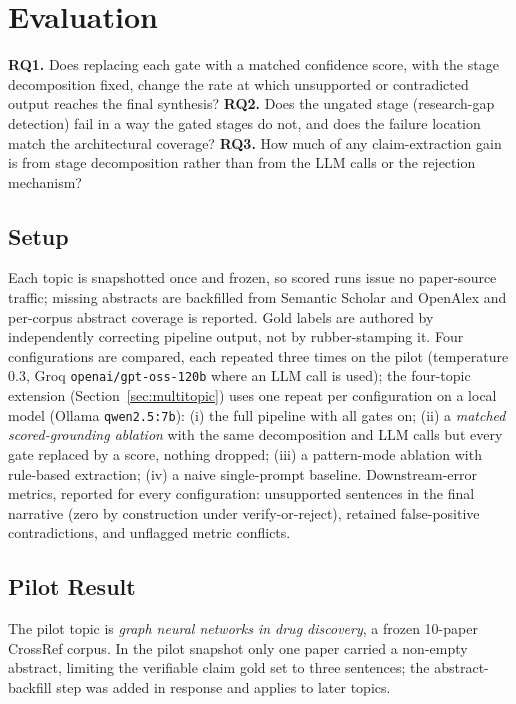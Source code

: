 \documentclass[conference]{IEEEtran}
\newcommand{\NumTopics}{four}
\newcommand{\NumRuns}{three}
\begin{document}
\section{Evaluation}
\textbf{RQ1.} Does replacing each gate with a matched confidence score, with the
stage decomposition fixed, change the rate at which unsupported or contradicted
output reaches the final synthesis?
\textbf{RQ2.} Does the ungated stage (research-gap detection) fail in a way the
gated stages do not, and does the failure location match the architectural
coverage?
\textbf{RQ3.} How much of any claim-extraction gain is from stage decomposition
rather than from the LLM calls or the rejection mechanism?

\subsection{Setup}
Each topic is snapshotted once and frozen, so scored runs issue no paper-source
traffic; missing abstracts are backfilled from Semantic Scholar and OpenAlex and
per-corpus abstract coverage is reported. Gold labels are authored by
independently correcting pipeline output, not by rubber-stamping it. Four
configurations are compared, each repeated \NumRuns{} times on the pilot
(temperature 0.3, Groq \texttt{openai/gpt-oss-120b} where an LLM call is used);
the \NumTopics{}-topic extension (Section~\ref{sec:multitopic}) uses one repeat
per configuration on a local model (Ollama \texttt{qwen2.5:7b}): (i) the full
pipeline with all gates on; (ii) a \emph{matched scored-grounding ablation} with
the same decomposition and LLM calls but every gate replaced by a score, nothing
dropped; (iii) a pattern-mode ablation with rule-based extraction; (iv) a naive
single-prompt baseline. Downstream-error metrics, reported for every
configuration: unsupported sentences in the final narrative (zero by
construction under verify-or-reject), retained false-positive contradictions, and
unflagged metric conflicts.

\subsection{Pilot Result}
The pilot topic is \emph{graph neural networks in drug discovery}, a frozen
10-paper CrossRef corpus. In the pilot snapshot only one paper carried a
non-empty abstract, limiting the verifiable claim gold set to three sentences;
the abstract-backfill step was added in response and applies to later topics.
\end{document}
